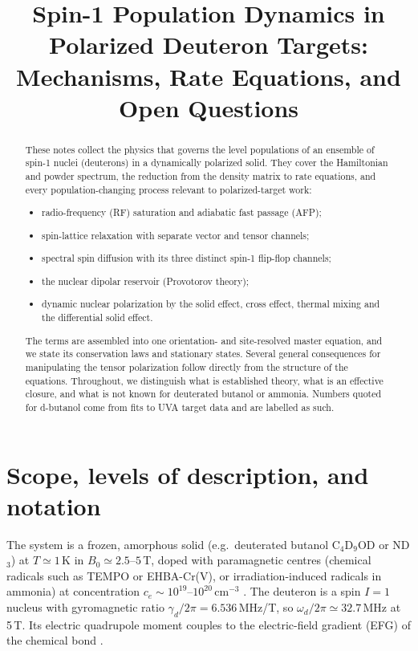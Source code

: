 \documentclass[11pt]{article}
\title{Spin-1 Population Dynamics in Polarized Deuteron Targets:\\
Mechanisms, Rate Equations, and Open Questions}
\author{}
\date{}
\begin{document}
\maketitle

\begin{abstract}
These notes collect the physics that governs the level populations of an ensemble of spin-1
nuclei (deuterons) in a dynamically polarized solid. They cover the Hamiltonian and powder
spectrum, the reduction from the density matrix to rate equations, and every population-changing
process relevant to polarized-target work:
\begin{itemize}
\item radio-frequency (RF) saturation and adiabatic fast passage (AFP);
\item spin-lattice relaxation with separate vector and tensor channels;
\item spectral spin diffusion with its three distinct spin-1 flip-flop channels;
\item the nuclear dipolar reservoir (Provotorov theory);
\item dynamic nuclear polarization by the solid effect, cross effect, thermal mixing and the
differential solid effect.
\end{itemize}
The terms are assembled into one orientation- and site-resolved master equation, and we state
its conservation laws and stationary states. Several general consequences for manipulating the
tensor polarization follow directly from the structure of the equations. Throughout, we
distinguish what is established theory, what is an effective closure, and what is not known
for deuterated butanol or ammonia. Numbers quoted for d-butanol come from fits to UVA target
data and are labelled as such.
\end{abstract}

\tableofcontents

\section{Scope, levels of description, and notation}
\label{sec:scope}

The system is a frozen, amorphous solid (e.g.\ deuterated butanol C$_4$D$_9$OD or ND$_3$) at
$T\simeq 1$\,K in $B_0\simeq 2.5$--$5$\,T, doped with paramagnetic centres (chemical radicals
such as TEMPO or EHBA-Cr(V), or irradiation-induced radicals in ammonia) at concentration
$c_e\sim 10^{19}$--$10^{20}$\,cm$^{-3}$ \cite{CrabbMeyer1997,Goertz2004,Meyer2004}. The
deuteron is a spin $I=1$ nucleus with gyromagnetic ratio
$\gamma_d/2\pi = 6.536$\,MHz/T, so $\omega_d/2\pi\simeq 32.7$\,MHz at 5\,T. Its electric
quadrupole moment couples to the electric-field gradient (EFG) of the chemical bond
\cite{CohenReif1957,Abragam1961,Wasylishen2012}.
\end{document}
